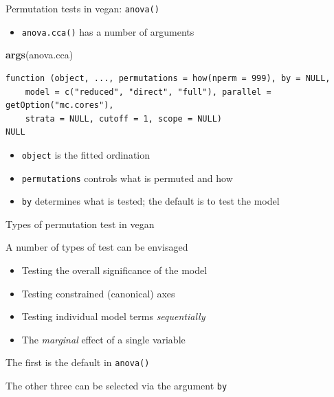 \documentclass[10pt,ignorenonframetext,compress, aspectratio=169]{beamer}
\newenvironment{Shaded}{\begin{snugshade}}{\end{snugshade}}
\newcommand{\KeywordTok}[1]{\textcolor[rgb]{0.13,0.29,0.53}{\textbf{{#1}}}}
\newcommand{\NormalTok}[1]{{#1}}
\providecommand{\tightlist}{%
  \setlength{\itemsep}{0pt}\setlength{\parskip}{0pt}}
\begin{document}
\begin{frame}[fragile]{Permutation tests in vegan: \texttt{anova()}}

\begin{itemize}
\tightlist
\item
  \texttt{anova.cca()} has a number of arguments
\end{itemize}

\tiny

\begin{Shaded}
\begin{Highlighting}[]
\KeywordTok{args}\NormalTok{(anova.cca)}
\end{Highlighting}
\end{Shaded}

\begin{verbatim}
function (object, ..., permutations = how(nperm = 999), by = NULL, 
    model = c("reduced", "direct", "full"), parallel = getOption("mc.cores"), 
    strata = NULL, cutoff = 1, scope = NULL) 
NULL
\end{verbatim}

\normalsize

\begin{itemize}
\tightlist
\item
  \texttt{object} is the fitted ordination
\item
  \texttt{permutations} controls what is permuted and how
\item
  \texttt{by} determines what is tested; the default is to test the
  model
\end{itemize}

\end{frame}

\begin{frame}[fragile]{Types of permutation test in vegan}

A number of types of test can be envisaged

\begin{itemize}
\tightlist
\item
  Testing the overall significance of the model
\item
  Testing constrained (canonical) axes
\item
  Testing individual model terms \emph{sequentially}
\item
  The \emph{marginal} effect of a single variable
\end{itemize}

The first is the default in \texttt{anova()}

The other three can be selected via the argument \texttt{by}

\end{frame}
\end{document}
